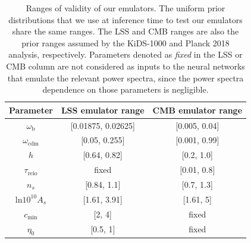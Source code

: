 \documentclass[fleqn,usenatbib]{mnras}
\begin{document}
\begin{table}
  \centering 
  \begin{tabular}{c|c|c}
    \textbf{Parameter}               &  \textbf{LSS emulator range} & \textbf{CMB emulator range} \\
    \hline
    \hline
    $\omega_{\mathrm{b}}$   & [0.01875, 0.02625] & [0.005, 0.04]\\
    \hline
    $\omega_{\mathrm{cdm}}$ & [0.05, 0.255]      & [0.001, 0.99]\\
    \hline
    $h$                     & [0.64, 0.82]       & [0.2, 1.0]\\
    \hline
    $\tau_{\mathrm{reio}}$                  & fixed              & [0.01, 0.8]\\
    \hline
    $n_s$                   & [0.84, 1.1]        & [0.7, 1.3]\\
    \hline
    $\mathrm{ln}10^{10}A_s$ & [1.61, 3.91]       & [1.61, 5]\\
    \hline
    $c_{\mathrm{min}}$      & [2, 4]           & fixed \\
    \hline
    $\eta_{0}$              & [0.5, 1]          & fixed \\
    \hline
    \hline
    \end{tabular}
   \caption{Ranges of validity of our emulators. The uniform prior distributions that we use at inference time to test our emulators share the same ranges. The LSS and CMB ranges are also the prior ranges assumed by the KiDS-1000 and Planck 2018 analysis, respectively. Parameters denoted as \textit{fixed} in the LSS or CMB column are not considered as inputs to the neural networks that emulate the relevant power spectra, since the power spectra dependence on those parameters is negligible.}
  \label{tab:emu_ranges}
\end{table}
\end{document}
